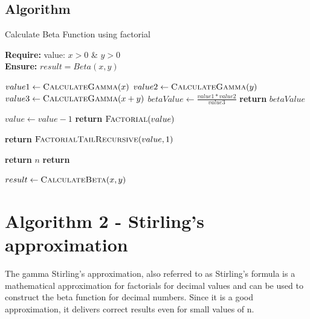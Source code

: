 \documentclass[a4paper, 12pt]{article}
\begin{document}
\newpage
\subsection{Algorithm}

\begin{algorithm}
\caption{Calculate Beta Function using factorial}

\textbf{Require:}  value: $x > 0$ \& $y>0$  \\
\textbf{Ensure:} $result = Beta(x,y)$
\begin{algorithmic}[1]

    \State $value1 \leftarrow \Call{CalculateGamma}{x}$
    \State $value2 \leftarrow \Call{CalculateGamma}{y}$
    \State $value3 \leftarrow \Call{CalculateGamma}{x+y}$
    \State $betaValue \leftarrow \frac{value1 * value2}{value3}$
    \State \textbf{return} $betaValue$
    \EndProcedure
\Statex


    \State $value \leftarrow value-1$
    \State \textbf{return} $\Call{Factorial}{value}$ 
    \EndProcedure
\Statex

    \State \textbf{return} $\Call{FactorialTailRecursive}{value,1}$ 
    \EndProcedure
\Statex

    \State \textbf{return} $n$  
    \Else
    \State \textbf{return}  
    \EndIf
    \EndProcedure
\Statex


\State $result \leftarrow \Call{CalculateBeta}{x,y} $

\end{algorithmic}
\end{algorithm}

\newpage
\section{Algorithm 2 - Stirling's approximation}
The gamma Stirling's approximation, also referred to as Stirling's formula is a mathematical approximation for factorials for decimal values and can be used to construct the beta function for decimal numbers. Since it is a good approximation, it delivers correct results even for small values of n. \\
\end{document}
